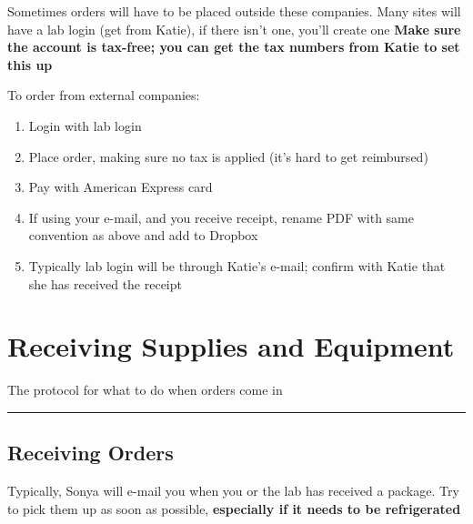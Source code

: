 \documentclass[
  letterpaper,
  DIV=11,
  numbers=noendperiod]{scrreprt}
\begin{document}

Sometimes orders will have to be placed outside these companies. Many
sites will have a lab login (get from Katie), if there isn't one, you'll
create one \textbf{Make sure the account is tax-free; you can get the
tax numbers from Katie to set this up}

To order from external companies:

\begin{enumerate}
\def\labelenumi{\arabic{enumi}.}
\item
  Login with lab login
\item
  Place order, making sure no tax is applied (it's hard to get
  reimbursed)
\item
  Pay with American Express card
\item
  If using your e-mail, and you receive receipt, rename PDF with same
  convention as above and add to Dropbox
\item
  Typically lab login will be through Katie's e-mail; confirm with Katie
  that she has received the receipt
\end{enumerate}

\hypertarget{receiving-supplies-and-equipment}{%
\chapter{Receiving Supplies and
Equipment}\label{receiving-supplies-and-equipment}}

The protocol for what to do when orders come in

\begin{center}\rule{0.5\linewidth}{0.5pt}\end{center}

\hypertarget{receiving-orders}{%
\section*{\texorpdfstring{\textbf{Receiving
Orders}}{Receiving Orders}}\label{receiving-orders}}


Typically, Sonya will e-mail you when you or the lab has received a
package. Try to pick them up as soon as possible, \textbf{especially if
it needs to be refrigerated}
\end{document}
